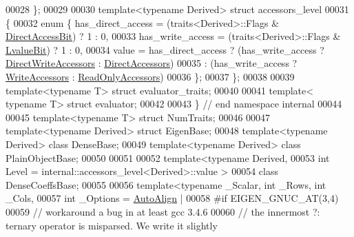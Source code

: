 \begin{DoxyCode}
00028 \};
00029 
00030 \textcolor{keyword}{template}<\textcolor{keyword}{typename} Derived> \textcolor{keyword}{struct }accessors\_level
00031 \{
00032   \textcolor{keyword}{enum} \{ has\_direct\_access = (traits<Derived>::Flags & \hyperlink{group__flags_gabf1e9d0516a933445a4c307ad8f14915}{DirectAccessBit}) ? 1 : 0,
00033          has\_write\_access = (traits<Derived>::Flags & \hyperlink{group__flags_gae2c323957f20dfdc6cb8f44428eaec1a}{LvalueBit}) ? 1 : 0,
00034          value = has\_direct\_access ? (has\_write\_access ? \hyperlink{group__enums_gga9f93eac38eb83deb0e8dbd42ddf11d5dae218802d4436c6907e60368c28609472}{DirectWriteAccessors} : 
      \hyperlink{group__enums_gga9f93eac38eb83deb0e8dbd42ddf11d5da47996b52dd3a8c298a8821675a557c55}{DirectAccessors})
00035                                    : (has\_write\_access ? \hyperlink{group__enums_gga9f93eac38eb83deb0e8dbd42ddf11d5da2c59ef3697d65866c3a8e16eda7881ab}{WriteAccessors}       : 
      \hyperlink{group__enums_gga9f93eac38eb83deb0e8dbd42ddf11d5da42865f87356ad7e585a1bfbfd1b81699}{ReadOnlyAccessors})
00036   \};
00037 \};
00038 
00039 \textcolor{keyword}{template}<\textcolor{keyword}{typename} T> \textcolor{keyword}{struct }evaluator\_traits;
00040 
00041 \textcolor{keyword}{template}< \textcolor{keyword}{typename} T> \textcolor{keyword}{struct }evaluator;
00042 
00043 \} \textcolor{comment}{// end namespace internal}
00044 
00045 \textcolor{keyword}{template}<\textcolor{keyword}{typename} T> \textcolor{keyword}{struct }NumTraits;
00046 
00047 \textcolor{keyword}{template}<\textcolor{keyword}{typename} Derived> \textcolor{keyword}{struct }EigenBase;
00048 \textcolor{keyword}{template}<\textcolor{keyword}{typename} Derived> \textcolor{keyword}{class }DenseBase;
00049 \textcolor{keyword}{template}<\textcolor{keyword}{typename} Derived> \textcolor{keyword}{class }PlainObjectBase;
00050 
00051 
00052 \textcolor{keyword}{template}<\textcolor{keyword}{typename} Derived,
00053          \textcolor{keywordtype}{int} Level = internal::accessors\_level<Derived>::value >
00054 \textcolor{keyword}{class }DenseCoeffsBase;
00055 
00056 \textcolor{keyword}{template}<\textcolor{keyword}{typename} \_Scalar, \textcolor{keywordtype}{int} \_Rows, \textcolor{keywordtype}{int} \_Cols,
00057          \textcolor{keywordtype}{int} \_Options = \hyperlink{group__enums_ggaacded1a18ae58b0f554751f6cdf9eb13a28d63c0dd8560827162decfd898804f4}{AutoAlign} |
00058 \textcolor{preprocessor}{#if EIGEN\_GNUC\_AT(3,4)}
00059     \textcolor{comment}{// workaround a bug in at least gcc 3.4.6}
00060     \textcolor{comment}{// the innermost ?: ternary operator is misparsed. We write it slightly}

\end{DoxyCode}
